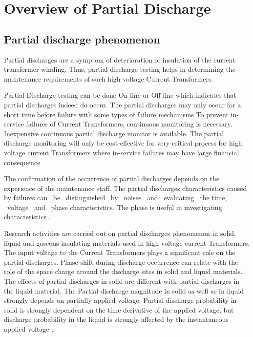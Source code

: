 
\section{Overview of Partial Discharge}

\subsection{Partial discharge phenomenon}
Partial discharges are a symptom of deterioration of insulation of the current transformer winding. Thus, partial discharge testing helps in determining the maintenance requirements of such high voltage Current Transformers\setlength{\parskip}{1em}.

Partial Discharge testing can be done On line or Off line which indicates that partial discharges indeed do occur. The partial discharges may only occur for a short time before failure with some types of failure mechanisms To prevent in-service failures of Current Transformers, continuous monitoring is necessary. Inexpensive continuous partial discharge monitor is available. The partial discharge monitoring will only be cost-effective for very critical process for high voltage current Transformers where in-service failures may have large financial consequence

The confirmation of the occurrence of partial discharges depends on the experience of the maintenance staff. The partial discharges characteristics caused by failures can ~be ~distinguished ~by ~noises ~and ~evaluating ~the time, ~voltage ~and ~phase characteristics. The phase is useful in investigating characteristics \cite{kim2003acoustic}.

Research activities are carried out on partial discharges phenomenon in solid, liquid and gaseous insulating materials used in high voltage current Transformers. The input voltage to the Current Transformers plays a significant role on the partial discharges. Phase shift during discharge occurrence can relate with the role of the space charge around the discharge sites in solid and liquid materials. The effects of partial discharges in solid are different with partial discharges in the liquid material. The Partial discharge magnitude in solid as well as in liquid strongly depends on partially applied voltage. Partial discharge probability in solid is strongly dependent on the time derivative of the applied voltage, but discharge probability in the liquid is strongly affected by the instantaneous applied voltage \cite{chen2008partial, forssen2008partial, standard200060270}. 

